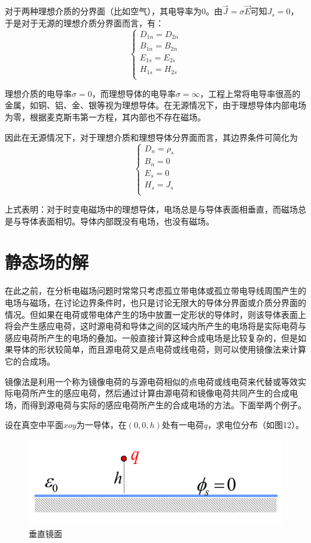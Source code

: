 \documentclass[UTF8,a4paper,11pt]{article}
\begin{document}
对于两种理想介质的分界面（比如空气），其电导率为0。由$\overrightarrow{J}=\sigma\overrightarrow{E}$可知$J_s=0$，于是对于无源的理想介质分界面而言，有：
\begin{equation}
\begin{cases}
D_{1n}=D_{2n}\\
B_{1n}=B_{2n}\\
E_{1s}=E_{2s}\\
H_{1s}=H_{2s}\\
\end{cases}
\end{equation}

理想介质的电导率$\sigma=0$，而理想导体的电导率$\sigma=\infty$，工程上常将电导率很高的金属，如铜、铝、金、银等视为理想导体。在无源情况下，由于理想导体内部电场为零，根据麦克斯韦第一方程，其内部也不存在磁场。

因此在无源情况下，对于理想介质和理想导体分界面而言，其边界条件可简化为
\begin{equation}
\begin{cases}
D_n=\rho_s\\
B_n=0\\
E_s=0\\
H_s=J_s\\
\end{cases}
\end{equation}

上式表明：对于时变电磁场中的理想导体，电场总是与导体表面相垂直，而磁场总是与导体表面相切。导体内部既没有电场，也没有磁场。

\section{静态场的解}
在此之前，在分析电磁场问题时常常只考虑孤立带电体或孤立带电导线周围产生的电场与磁场，在讨论边界条件时，也只是讨论无限大的导体分界面或介质分界面的情况。但如果在电荷或带电体产生的场中放置一定形状的导体时，则该导体表面上将会产生感应电荷，这时源电荷和导体之间的区域内所产生的电场将是实际电荷与感应电荷所产生的电场的叠加。一般直接计算这种合成电场是比较复杂的，但是如果导体的形状较简单，而且源电荷又是点电荷或线电荷，则可以使用镜像法来计算它的合成场。

镜像法是利用一个称为镜像电荷的与源电荷相似的点电荷或线电荷来代替或等效实际电荷所产生的感应电荷，然后通过计算由源电荷和镜像电荷共同产生的合成电场，而得到源电荷与实际的感应电荷所产生的合成电场的方法。下面举两个例子。

设在真空中平面$xoy$为一导体，在$(0,0,h)$处有一电荷$q$，求电位分布（如图12）。
\begin{figure}[htbp]
\centering
\includegraphics[scale=0.3]{p12.png}
\caption{垂直镜面}
\end{figure}
\end{document}

